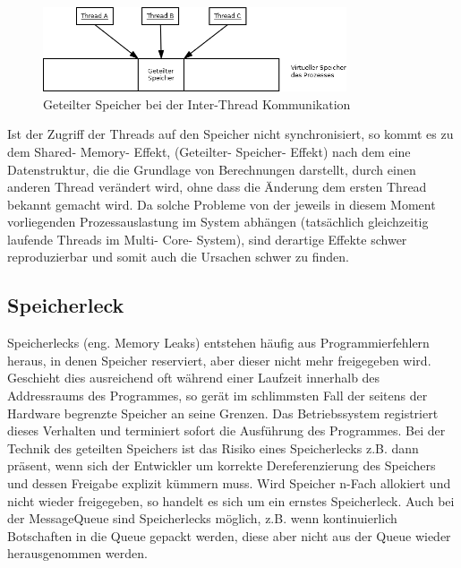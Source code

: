 \documentclass[12pt,oneside,a4paper,bibtotoc,liststotoc]{scrreprt}
\begin{document}
\begin{figure}[H]
  \begin{centering}
    \includegraphics[width=0.8\textwidth]{img/SharedMemory_RaceCondition.png}
    \caption{Geteilter Speicher bei der Inter-Thread Kommunikation}
    \label{SharedMemory_RaceCondition}
  \end{centering}
\end{figure}
Ist der Zugriff der Threads auf den Speicher nicht synchronisiert, so kommt es zu dem Shared- Memory- Effekt, (Geteilter- Speicher- Effekt) nach dem eine Datenstruktur, die die Grundlage von Berechnungen darstellt, durch einen anderen Thread verändert wird, ohne dass die Änderung dem ersten Thread bekannt gemacht wird. Da solche Probleme von der jeweils in diesem Moment vorliegenden Prozessauslastung im System abhängen (tatsächlich gleichzeitig laufende Threads im Multi- Core- System), sind derartige Effekte schwer reproduzierbar und somit auch die Ursachen schwer zu finden.


\subsection{Speicherleck}
Speicherlecks (eng. Memory Leaks) entstehen häufig aus Programmierfehlern heraus, in denen Speicher reserviert, aber dieser nicht mehr freigegeben wird. Geschieht dies ausreichend oft während einer Laufzeit innerhalb des Addressraums des Programmes, so gerät im schlimmsten Fall der seitens der Hardware begrenzte Speicher an seine Grenzen. Das Betriebssystem registriert dieses Verhalten und terminiert sofort die Ausführung des Programmes. Bei der Technik des geteilten Speichers ist das Risiko eines Speicherlecks z.B. dann präsent, wenn sich der Entwickler um korrekte Dereferenzierung des Speichers und dessen Freigabe explizit kümmern muss. Wird Speicher n-Fach allokiert und nicht wieder freigegeben, so handelt es sich um ein ernstes Speicherleck. Auch bei der MessageQueue sind Speicherlecks möglich, z.B. wenn kontinuierlich Botschaften in die Queue gepackt werden, diese aber nicht aus der Queue wieder herausgenommen werden.
\end{document}
